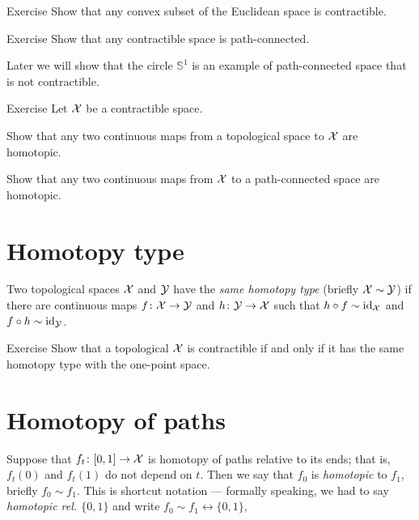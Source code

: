 \begin{thm}{Exercise}
Show that any convex subset of the Euclidean space is contractible.
\end{thm}


\begin{thm}{Exercise}
Show that any contractible space is path-connected.
\end{thm}

Later we will show that the circle $\mathbb{S}^1$ is an example of path-connected space that is not contractible.

\begin{thm}{Exercise}
Let $\mathcal{X}$ be a contractible space.

\begin{subthm}{}
Show that any two continuous maps from a topological space to $\mathcal{X}$ are homotopic.
\end{subthm}

\begin{subthm}{}
Show that any two continuous maps from $\mathcal{X}$ to a path-connected space are homotopic.
\end{subthm}

\end{thm}

\section{Homotopy type}

Two topological spaces $\mathcal{X}$ and $\mathcal{Y}$ have the \emph{same homotopy type} (briefly $\mathcal{X}\sim\mathcal{Y}$) if there are continuous maps
$f\colon \mathcal{X}\to \mathcal{Y}$ and $h\colon\mathcal{Y}\to \mathcal{X}$ such that $h\circ f\sim \mathrm{id}_\mathcal{X}$ and $f\circ h\sim \mathrm{id}_\mathcal{Y}$.

\begin{thm}{Exercise}
Show that a topological $\mathcal{X}$ is contractible if and only if it has the same homotopy type with the one-point space.
\end{thm}

\section{Homotopy of paths}

Suppose that $f_t\colon[0,1]\to\mathcal{X}$ is homotopy of paths relative to its ends;
that is, $f_t(0)$ and $f_t(1)$ do not depend on $t$.
Then we say that $f_0$ is \emph{homotopic} to  $f_1$, briefly $f_0\sim f_1$.
This is shortcut notation --- formally speaking, we had to say \emph{homotopic rel. $\{0,1\}$} and write $f_0\sim f_1\rel{\{0,1\}}$,

